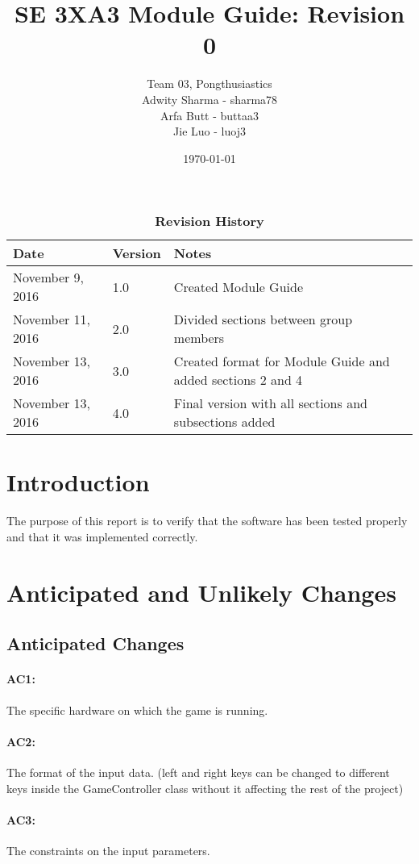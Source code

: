 \documentclass[12pt,letterpaper]{article}
\title{SE 3XA3 Module Guide: Revision 0}
\author{Team 03, Pongthusiastics 		
\\ Adwity Sharma - sharma78 		
\\ Arfa Butt - buttaa3 	
	\\ Jie Luo - luoj3 }
\date{\today}
\begin{document}
\maketitle
\newpage
\tableofcontents

\listoftables
\listoffigures
\begin{table}[h]
\caption{\bf Revision History}
\begin{tabularx}{\textwidth}{p{3.5cm}p{2cm}X}
\toprule {\bf Date} & {\bf Version} & {\bf Notes}\\
\midrule
November 9, 2016 & 1.0 & Created Module Guide \\
November 11, 2016 & 2.0 & Divided sections between group members \\
November 13, 2016 & 3.0 & Created format for Module Guide and added sections 2 and 4 \\
November 13, 2016 & 4.0 & Final version with all sections and subsections added \\
\bottomrule
\end{tabularx}
\end{table}

\clearpage
	
	\section{Introduction}
	The purpose of this report is to verify that the software has been tested properly and that it was implemented correctly.
	
	\section{Anticipated and Unlikely Changes}
	\subsection{Anticipated Changes}
	\paragraph{AC1:}	The specific hardware on which the game is running.
	\paragraph{AC2:}	The format of the input data. (left and right keys can be changed to different keys inside the GameController class without it affecting the rest of the project)
	\paragraph{AC3:}	The constraints on the input parameters.
\end{document}
